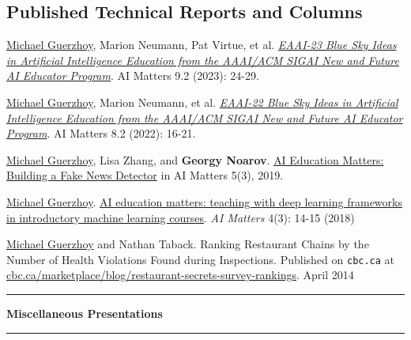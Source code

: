 \documentclass[letterpaper,11pt]{article}
\newcommand{\resheading}[1]{%
  \vspace{10pt}%
  \noindent\textcolor{accent}{\rule{3pt}{12pt}}\hspace{6pt}%
  {\large \textbf{\textcolor{accent}{#1}}}%
  \vspace{2pt}%
  \par\noindent\textcolor{accent!30}{\rule{\textwidth}{0.5pt}}%
  \vspace{2pt}%
}
\begin{document}
\subsection*{Published Technical Reports and Columns}
\begin{revnumerate}
\item \underline{Michael Guerzhoy}, Marion Neumann, Pat Virtue, et al. \textit{\href{https://dl.acm.org/doi/10.1145/3609468.3609474}{EAAI-23 Blue Sky Ideas in Artificial Intelligence Education from the AAAI/ACM SIGAI New and Future AI Educator Program}}. AI Matters 9.2 (2023): 24-29.

\item \underline{Michael Guerzhoy}, Marion Neumann, et al. \textit{\href{https://doi.org/10.1145/3557785.3557789}{EAAI-22 Blue Sky Ideas in Artificial Intelligence Education from the AAAI/ACM SIGAI New and Future AI Educator Program}}. AI Matters 8.2 (2022): 16-21.
	
\item \underline{Michael Guerzhoy}, Lisa Zhang, and \textbf{Georgy Noarov}.  \href{https://dl.acm.org/doi/10.1145/3362077.3362082}{AI Education Matters: Building a Fake News Detector} in AI Matters 5(3), 2019.

\item
\underline{Michael Guerzhoy}. \href{https://sigai.acm.org/static/aimatters/4-3/AIMatters-4-3-05-Guerzhoy.pdf}{AI education matters: teaching with deep learning frameworks in introductory machine learning courses}. \textit{AI Matters} 4(3): 14-15 (2018)

\item
\underline{Michael Guerzhoy} and Nathan Taback.  Ranking Restaurant Chains by the Number of Health Violations Found during Inspections. Published on \texttt{cbc.ca} at \href{https://web.archive.org/web/20150521073055/http://www.cbc.ca/marketplace/blog/restaurant-secrets-survey-rankings}{cbc.ca/marketplace/blog/restaurant-secrets-survey-rankings}. April 2014
\end{revnumerate}


\resheading{Miscellaneous Presentations}
\end{document}
